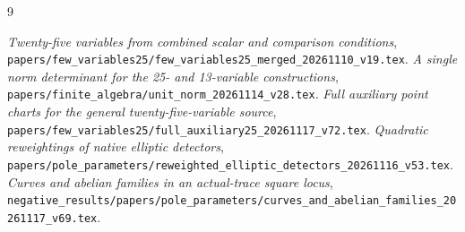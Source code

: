 \documentclass[11pt,a4paper]{article}
\begin{document}
\begin{thebibliography}{9}\raggedright
{}\emph{Twenty-five variables from combined scalar and
comparison conditions},
\nolinkurl{papers/few_variables25/few_variables25_merged_20261110_v19.tex}.
\emph{A single norm determinant for the 25- and
13-variable constructions},
\nolinkurl{papers/finite_algebra/unit_norm_20261114_v28.tex}.
\emph{Full auxiliary point charts for the general
twenty-five-variable source},
\nolinkurl{papers/few_variables25/full_auxiliary25_20261117_v72.tex}.
\emph{Quadratic reweightings of native elliptic
detectors},
\nolinkurl{papers/pole_parameters/reweighted_elliptic_detectors_20261116_v53.tex}.
\emph{Curves and abelian families in an
actual-trace square locus},
\nolinkurl{negative_results/papers/pole_parameters/curves_and_abelian_families_20261117_v69.tex}.
\end{thebibliography}
\end{document}
